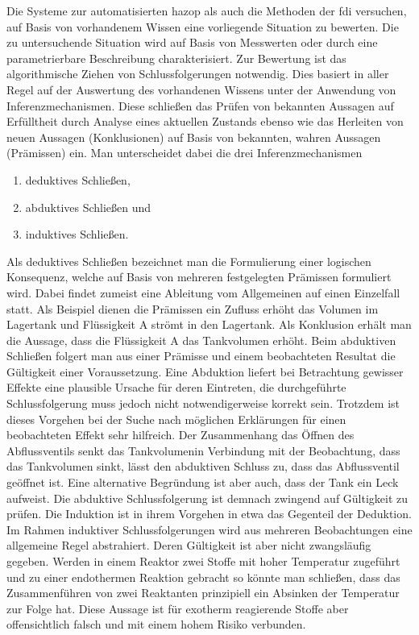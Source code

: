 Die Systeme zur automatisierten \ac{hazop} als auch die Methoden der \ac{fdi} versuchen, auf Basis von vorhandenem Wissen eine vorliegende Situation zu bewerten. Die zu untersuchende Situation wird auf Basis von Messwerten oder durch eine parametrierbare Beschreibung charakterisiert. Zur Bewertung ist das algorithmische Ziehen von Schlussfolgerungen notwendig. Dies basiert in aller Regel auf der Auswertung des vorhandenen Wissens unter der Anwendung von \glqq Inferenzmechanismen\grqq { }. Diese schlie\ss{}en das Pr\"ufen von bekannten Aussagen auf Erf\"ulltheit durch Analyse eines aktuellen Zustands ebenso wie das Herleiten von neuen Aussagen (Konklusionen) auf Basis von bekannten, wahren Aussagen (Pr\"amissen) ein. Man unterscheidet dabei die drei Inferenzmechanismen \begin{enumerate}
\item deduktives Schlie\ss{}en,
\item abduktives Schlie\ss{}en und
\item induktives Schlie\ss{}en.
\end{enumerate} 
Als deduktives Schlie\ss{}en bezeichnet man die Formulierung einer logischen Konsequenz, welche auf Basis von mehreren festgelegten Pr\"amissen formuliert wird. Dabei findet zumeist eine Ableitung vom Allgemeinen auf einen Einzelfall statt. Als Beispiel dienen die Pr\"amissen ein Zufluss erh\"oht das Volumen im Lagertank und Fl\"ussigkeit A str\"omt in den Lagertank. Als Konklusion erh\"alt man die Aussage, dass die Fl\"ussigkeit A das Tankvolumen erh\"oht. \newline
Beim abduktiven Schlie\ss{}en folgert man aus einer Pr\"amisse und einem beobachteten Resultat die G\"ultigkeit einer Voraussetzung. Eine Abduktion liefert bei Betrachtung gewisser Effekte eine plausible Ursache f\"ur deren Eintreten, die durchgef\"uhrte Schlussfolgerung muss jedoch nicht notwendigerweise korrekt sein. Trotzdem ist dieses Vorgehen bei der Suche nach m\"oglichen Erkl\"arungen f\"ur einen beobachteten Effekt sehr hilfreich. Der Zusammenhang \glqq das \"Offnen des Abflussventils senkt das Tankvolumen\grqq { }in Verbindung mit der Beobachtung, dass das Tankvolumen sinkt, l\"asst den abduktiven Schluss zu, dass das Abflussventil ge\"offnet ist. Eine alternative Begr\"undung ist aber auch, dass der Tank ein Leck aufweist. Die abduktive Schlussfolgerung ist demnach zwingend auf G\"ultigkeit zu pr\"ufen. \newline
Die Induktion ist in ihrem Vorgehen in etwa das Gegenteil der Deduktion. Im Rahmen induktiver Schlussfolgerungen wird aus mehreren Beobachtungen eine allgemeine Regel abstrahiert. Deren G\"ultigkeit ist aber nicht zwangsl\"aufig gegeben. Werden in einem Reaktor zwei Stoffe mit hoher Temperatur zugef\"uhrt und zu einer endothermen Reaktion gebracht so k\"onnte man schlie\ss{}en, dass das Zusammenf\"uhren von zwei Reaktanten prinzipiell ein Absinken der Temperatur zur Folge hat. Diese Aussage ist f\"ur exotherm reagierende Stoffe aber offensichtlich falsch und mit einem hohem Risiko verbunden. \newline
